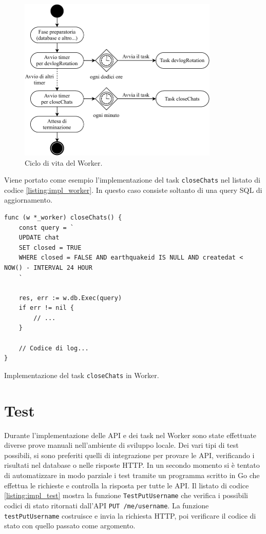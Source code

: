 \afterpage{\clearpage}

\begin{figure}[ht!]
\centering
\includegraphics[width=0.85\textwidth]{assets/04/ciclo_vita_worker.pdf}
\caption{Ciclo di vita del Worker.}
\label{fig:ciclo_worker}
\end{figure}

Viene portato come esempio l'implementazione del task \texttt{closeChats} nel listato di codice \ref{listing:impl_worker}. In questo caso consiste soltanto di una query SQL di aggiornamento.

\begin{longlisting}
\begin{verbatim}
func (w *_worker) closeChats() {
	const query = `
	UPDATE chat
	SET closed = TRUE
	WHERE closed = FALSE AND earthquakeid IS NULL AND createdat < NOW() - INTERVAL 24 HOUR
	`

	res, err := w.db.Exec(query)
	if err != nil {
		// ...
	}
	
	// Codice di log...
}
\end{verbatim}
\caption{Implementazione del task \texttt{closeChats} in Worker.}
\label{listing:impl_worker}
\end{longlisting}

\section{Test}

Durante l'implementazione delle API e dei task nel Worker sono state effettuate diverse prove manuali nell'ambiente di sviluppo locale. Dei vari tipi di test possibili, si sono preferiti quelli di integrazione per provare le API, verificando i risultati nel database o nelle risposte HTTP. In un secondo momento si è tentato di automatizzare in modo parziale i test tramite un programma scritto in Go che effettua le richieste e controlla la risposta per tutte le API. Il listato di codice \ref{listing:impl_test} mostra la funzione \texttt{TestPutUsername} che verifica i possibili codici di stato ritornati dall'API \texttt{PUT /me/username}. La funzione \texttt{testPutUsername} costruisce e invia la richiesta HTTP, poi verificare il codice di stato con quello passato come argomento.

